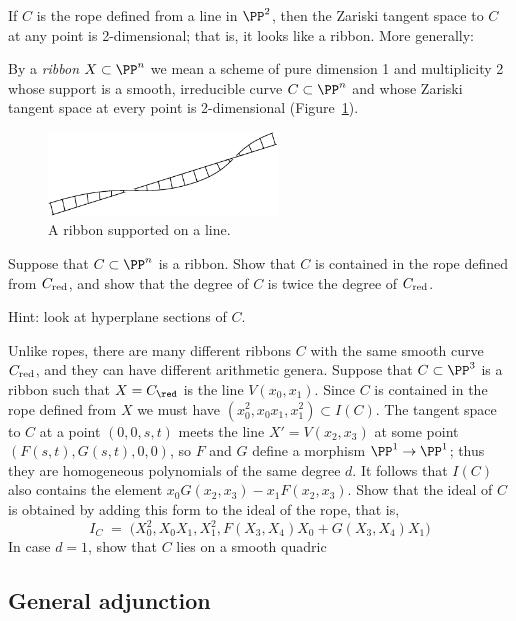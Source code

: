 If $C$ is the rope defined from a line in $\PP^2$, then the Zariski tangent space to $C$ at
any point is 2-dimensional; that is, it looks like a ribbon. More generally:

\begin{definition}
By a \emph{ribbon} $X \subset \PP^n$ we  mean a scheme of pure dimension 1 and multiplicity 2 whose support is a smooth, irreducible curve $C \subset \PP^n$ and whose Zariski tangent space at every point is 2-dimensional (Figure~\ref{Fig15.3}).
\end{definition}


\begin{figure}
\vskip-5pt
\centerline {\includegraphics[width=2.4in]{"main/Fig15-3"}}
\vskip-8pt
\caption{A ribbon supported on a line.}
\label{Fig15.3}
\end{figure}

\begin{exercise}
Suppose that $C\subset \PP^n$ is a ribbon. Show that $C$ is contained in the rope defined
from $C_{\rm red}$, and show that the degree of $C$ is twice the degree of $C_{\rm red}$.

Hint: look at hyperplane sections of $C$.
\end{exercise}

Unlike ropes, there are many different ribbons $C$ with the same smooth curve $C_{\rm red}$,
and they can have different arithmetic genera. 
Suppose that $C\subset \PP^3$ is a ribbon such that $X = C_{\red}$ is the line $V(x_0,x_1)$.
Since $C$ is contained in the rope defined from $X$ we must have $(x_0^2, x_0x_1,x_1^2) \subset I(C)$. The tangent space to $C$ at a point $(0,0,s,t)$ meets the line  $X' = V(x_2, x_3)$
at some point $(F(s,t),G(s,t),0,0)$, so $F$ and $G$ define a morphism $\PP^1 \to \PP^1$;
thus they are homogeneous polynomials of the same degree $d$.  It follows that $I(C)$ also contains the element
$x_0 G(x_2, x_3) - x_1F(x_2,x_3)$. Show that the ideal of $C$ is obtained by adding this form to the ideal of the rope, that is,
$$
I_C \; = \; \big(X_0^2, X_0X_1, X_1^2, F(X_3,X_4)X_0 + G(X_3,X_4)X_1\big)
$$
In case $d=1$, show that $C$ lies on a smooth quadric 
\subsection{General adjunction}

